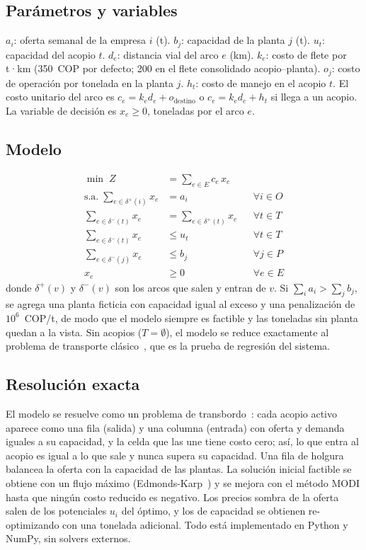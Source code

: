 \documentclass[conference]{IEEEtran}
\begin{document}
\subsection{Parámetros y variables}
$a_i$: oferta semanal de la empresa $i$ (t). $b_j$: capacidad de la planta $j$ (t). $u_t$: capacidad
del acopio $t$. $d_e$: distancia vial del arco $e$ (km). $k_e$: costo de flete por t·km
(350~COP por defecto; 200 en el flete consolidado acopio–planta). $o_j$: costo de operación por
tonelada en la planta $j$. $h_t$: costo de manejo en el acopio $t$. El costo unitario del arco es
$c_e = k_e d_e + o_{\text{destino}}$ o $c_e = k_e d_e + h_t$ si llega a un acopio. La variable de
decisión es $x_e \ge 0$, toneladas por el arco $e$.

\subsection{Modelo}
\begin{align}
\min\; Z &= \sum_{e\in E} c_e\, x_e \\
\text{s.a.}\; \sum_{e\in\delta^+(i)} x_e &= a_i && \forall i\in O \\
\sum_{e\in\delta^-(t)} x_e &= \sum_{e\in\delta^+(t)} x_e && \forall t\in T \\
\sum_{e\in\delta^-(t)} x_e &\le u_t && \forall t\in T \\
\sum_{e\in\delta^-(j)} x_e &\le b_j && \forall j\in P \\
x_e &\ge 0 && \forall e\in E
\end{align}
donde $\delta^+(v)$ y $\delta^-(v)$ son los arcos que salen y entran de $v$. Si
$\sum_i a_i > \sum_j b_j$, se agrega una planta ficticia con capacidad igual al exceso y una
penalización de $10^6$~COP/t, de modo que el modelo siempre es factible y las toneladas sin planta
quedan a la vista. Sin acopios ($T=\emptyset$), el modelo se reduce exactamente al problema de
transporte clásico~\cite{hillier}, que es la prueba de regresión del sistema.

\subsection{Resolución exacta}
El modelo se resuelve como un problema de transbordo~\cite{hillier}: cada acopio activo aparece como
una fila (salida) y una columna (entrada) con oferta y demanda iguales a su capacidad, y la celda que
las une tiene costo cero; así, lo que entra al acopio es igual a lo que sale y nunca supera su
capacidad. Una fila de holgura balancea la oferta con la capacidad de las plantas. La solución inicial
factible se obtiene con un flujo máximo (Edmonds-Karp~\cite{edmonds}) y se mejora con el método MODI
hasta que ningún costo reducido es negativo. Los precios sombra de la oferta salen de los potenciales
$u_i$ del óptimo, y los de capacidad se obtienen re-optimizando con una tonelada adicional. Todo está
implementado en Python y NumPy, sin solvers externos.
\end{document}
